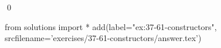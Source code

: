 
\begin{ex}
  \label{ex:37-61-constructors}
  
  \qed
\end{ex}
\begin{python0}
from solutions import *
add(label="ex:37-61-constructors",
    srcfilename='exercises/37-61-constructors/answer.tex')
\end{python0}
